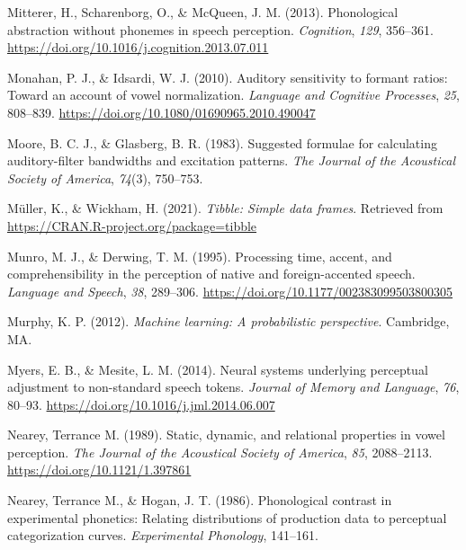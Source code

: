 \documentclass[
  11pt,
  english,
  man,floatsintext]{apa6}
\newlength{\cslhangindent}
\newlength{\cslentryspacingunit} %
\newenvironment{CSLReferences}[2] %
 {%
  \setlength{\parindent}{0pt}
  \ifodd #1
  \let\oldpar\par
  \def\par{\hangindent=\cslhangindent\oldpar}
  \fi
  \setlength{\parskip}{#2\cslentryspacingunit}
 }%
 {}
\begin{document}
\begin{CSLReferences}{1}{0}
\leavevmode{}%
Mitterer, H., Scharenborg, O., \& McQueen, J. M. (2013). Phonological abstraction without phonemes in speech perception. \emph{Cognition}, \emph{129}, 356--361. \url{https://doi.org/10.1016/j.cognition.2013.07.011}

\leavevmode{}%
Monahan, P. J., \& Idsardi, W. J. (2010). Auditory sensitivity to formant ratios: Toward an account of vowel normalization. \emph{Language and Cognitive Processes}, \emph{25}, 808--839. \url{https://doi.org/10.1080/01690965.2010.490047}

\leavevmode{}%
Moore, B. C. J., \& Glasberg, B. R. (1983). Suggested formulae for calculating auditory-filter bandwidths and excitation patterns. \emph{The Journal of the Acoustical Society of America}, \emph{74}(3), 750--753.

\leavevmode{}%
Müller, K., \& Wickham, H. (2021). \emph{Tibble: Simple data frames}. Retrieved from \url{https://CRAN.R-project.org/package=tibble}

\leavevmode{}%
Munro, M. J., \& Derwing, T. M. (1995). Processing time, accent, and comprehensibility in the perception of native and foreign-accented speech. \emph{Language and Speech}, \emph{38}, 289--306. \url{https://doi.org/10.1177/002383099503800305}

\leavevmode{}%
Murphy, K. P. (2012). \emph{Machine learning: A probabilistic perspective}. Cambridge, MA.

\leavevmode{}%
Myers, E. B., \& Mesite, L. M. (2014). Neural systems underlying perceptual adjustment to non-standard speech tokens. \emph{Journal of Memory and Language}, \emph{76}, 80--93. \url{https://doi.org/10.1016/j.jml.2014.06.007}

\leavevmode{}%
Nearey, Terrance M. (1989). Static, dynamic, and relational properties in vowel perception. \emph{The Journal of the Acoustical Society of America}, \emph{85}, 2088--2113. \url{https://doi.org/10.1121/1.397861}

\leavevmode{}%
Nearey, Terrance M., \& Hogan, J. T. (1986). Phonological contrast in experimental phonetics: Relating distributions of production data to perceptual categorization curves. \emph{Experimental Phonology}, 141--161.


\end{CSLReferences}
\end{document}
